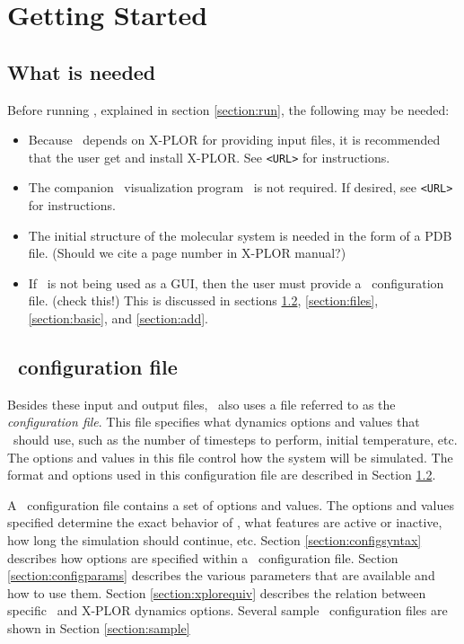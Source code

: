 \section{Getting Started}
\label{section:start}

\subsection{What is needed}

Before running \NAMD, explained in section \ref{section:run}, 
the following may be needed:
\begin{itemize}
\item
Because \NAMD\ depends on X-PLOR for providing input files, 
it is recommended that the user get and install X-PLOR.  
See \verb$<URL>$ for instructions.  
\item
The companion \MDSCOPE\ visualization program \VMD\ is not required.  
If desired, see \verb$<URL>$ for instructions.  
\item
The initial structure of the molecular system is needed in the 
form of a PDB file.  
(Should we cite a page number in X-PLOR manual?)  
\item
If \VMD\ is not being used as a GUI, then the user must provide 
a \NAMD\ configuration file.  (check this!)  
This is discussed in sections 
\ref{section:config}, \ref{section:files}, 
\ref{section:basic}, and \ref{section:add}.  
\end{itemize}

\subsection{\NAMD\ configuration file}
\label{section:config}

Besides these input and output files, \NAMD\ also uses 
a file referred to as the {\it configuration file\/}.  
This file specifies what dynamics options and values that 
\NAMD\ should use, such as the number of timesteps to perform, 
initial temperature, etc.  
The options and values in this file control how 
the system will be simulated.  
The format and options used in this configuration 
file are described in Section \ref{section:config}.  

A \NAMD\ configuration file contains a set of options and values.  
The options and values specified determine the exact behavior of
\NAMD, what features are active or inactive, how long the simulation
should continue, etc.  Section \ref{section:configsyntax} describes how
options are specified within a \NAMD\ configuration file.  Section
\ref{section:configparams} describes the various parameters that are
available and how to use them.  Section \ref{section:xplorequiv}
describes the relation between specific \NAMD\ and X-PLOR dynamics
options.  Several sample \NAMD\ configuration files are shown
in Section \ref{section:sample}


